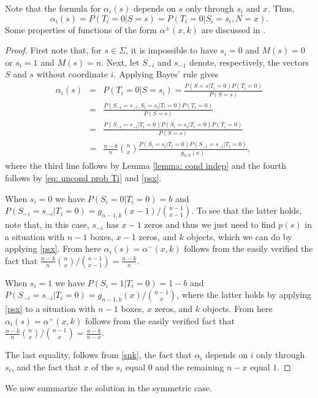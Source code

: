 \documentclass[a4paper,11pt]{article}
\begin{document}
Note that the formula for $\alpha_i(s)$ depends on $s$ only through $s_i$ and $x$. Thus,
\begin{equation*}
\alpha_i(s)=P(T_{i}=0|S=s)=P(T_{i}=0|S_i=s_{i},N=x).
\label{alx}
\end{equation*}
Some properties of functions of the form $\alpha^\pm(x,k)$ are discussed in \cite{son25}.

\begin{proof}
First note that, for $s\in\Sigma$, it is impossible to have $s_i=0$ and $M(s)=0$ or $s_i=1$ and $M(s)=n$. Next, let $S_{-i}$ and $s_{-1}$ denote, respectively, the vectors $S$ and $s$ without coordinate $i$. Applying Bayes' rule gives
\begin{eqnarray*}
\alpha_i(s) &=& P(T_i=0|S=s_i)= \frac{ P(S=s| T_i=0)P(T_i=0) }{P(S=s)} \\
&=& \frac{ P(S_{-i}=s_{-i}, S_i=s_i| T_i=0)P(T_i=0) }{P(S=s)} \\
&=& \frac{P(S_{-i}=s_{-i}| T_i=0) P(S_i=s_i| T_i=0)P(T_i=0) }{P(S=s)} \\
&=& \frac{n-k}{n}\binom{n}{x} \frac{P(S_i=s_i|T_i=0)P(S_{-i}=s_{-i}|T_i=0)}{g_{n,k}(x)},
\end{eqnarray*}
where the third line follows by Lemma \ref{lemma: cond indep} and the fourth follows by \eqref{eq: uncond prob Ti} and \eqref{psx}.

When $s_i=0$ we have $P(S_i=0|T_i=0)=b$ and $P(S_{-i}=s_{-i}|T_i=0)=g_{n-1,k}(x-1)/\binom{n-1}{x-1}$. To see that the latter holds, note that, in this case, $s_{-i}$ has $x-1$ zeros and thus we just need to find $p(s)$ in a situation with $n-1$ boxes, $x-1$ zeros, and $k$ objects, which we can do by applying \eqref{psx}. From here $\alpha_i(s) = \alpha^-(x,k)$ follows from the easily verified  the fact that $\frac{n-k}{n}{n\choose x}/{n-1\choose x-1}=\frac{n-k}{x}$.

When $s_i=1$ we have $P(S_i=1|T_i=0)=1-b$ and $P(S_{-i}=s_{-i}|T_i=0)=g_{n-1,k}(x)/\binom{n-1}{x}$, where the latter holds by applying \eqref{psx} to a situation with $n-1$ boxes, $x$ zeros, and $k$ objects. From here $\alpha_i(s) = \alpha^+(x,k)$ follows from the easily verified fact that $\frac{n-k}{n}{n\choose x}/{n-1\choose x}=\frac{n-k}{n-x}$.

The last equality, follows from \eqref{snk}, the fact that $\alpha_i$ depends on $i$ only through $s_i$, and the fact that $x$ of the $s_i$ equal $0$ and the remaining $n-x$ equal $1$. 
\end{proof}

We now summarize the solution in the symmetric case.
\end{document}
